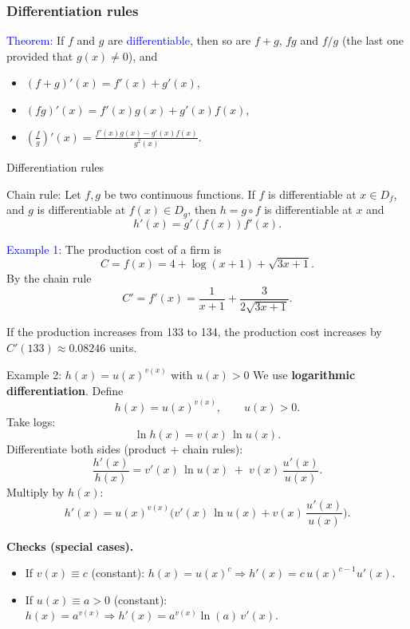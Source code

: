 \documentclass[11pt,aspectratio=169]{beamer}
\begin{document}
\begin{frame}
\frametitle{Differentiation rules}



\textcolor{blue}{Theorem:} If $f$ and $g$ are \textcolor{blue}{differentiable}, then so are $f+g$,
$fg$ and $f/g$ (the last one provided that $g(x) \neq 0$), and

\begin{itemize}
\item $(f+g)'(x)=f'(x)+g'(x)$,
\item $(fg)'(x)=f'(x)g(x)+g'(x)f(x)$,
\item $\left(\frac{f}{g}\right)'(x)=\frac{f'(x) g(x)-g'(x)f(x)}{g^2(x)}$.
\end{itemize}



\end{frame}






\begin{frame}{Differentiation rules}
\begin{alertblock}{Chain rule: }
	Let $f,g$ be two continuous functions. If $f$
is differentiable at $x \in D_f$, and $g$ is differentiable at $f(x)\in D_g$,
then $h=g \circ f$ is differentiable at $x$ and 
$$
h'(x)=g'(f(x)) f'(x).
$$
\end{alertblock}

\textcolor{blue}{Example 1:} The production cost of a firm  is
$$
C=f(x)=4+\log(x+1)+\sqrt{3x+1}.
$$
By the chain rule
$$
C'=f'(x)=\frac{1}{x+1}+\frac{3}{2\sqrt{3x+1}}.
$$
\begin{tiny}
 If the production increases from 133 to 134, the production cost increases  by $C'(133) \approx 0.08246$ units.
\end{tiny}
\end{frame}


\begin{frame}{Example 2: $h(x)=u(x)^{v(x)}$ with $u(x)>0$}
\small
We use \textbf{logarithmic differentiation}. Define
\[
h(x)=u(x)^{v(x)},\qquad u(x)>0.
\]
Take logs:
\[
\ln h(x) = v(x)\,\ln u(x).
\]
Differentiate both sides (product + chain rules):
\[
\frac{h'(x)}{h(x)} 
= v'(x)\,\ln u(x)\;+\;v(x)\,\frac{u'(x)}{u(x)}.
\]
Multiply by $h(x)$:
\[
\boxed{\;h'(x)=u(x)^{v(x)}
\Big(v'(x)\,\ln u(x) + v(x)\,\frac{u'(x)}{u(x)}\Big).\;}
\]

\medskip
\textbf{Checks (special cases).}
\begin{itemize}
\item If $v(x)\equiv c$ (constant): $h(x)=u(x)^c\Rightarrow 
h'(x)=c\,u(x)^{c-1}u'(x)$.
\item If $u(x)\equiv a>0$ (constant): $h(x)=a^{v(x)}\Rightarrow 
h'(x)=a^{v(x)}\ln(a)\,v'(x)$.
\end{itemize}
\end{frame}
\end{document}
